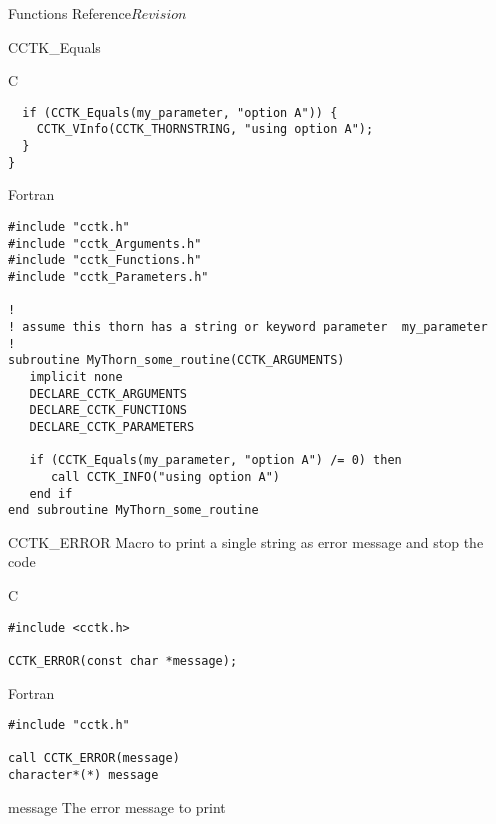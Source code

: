 \begin{cactuspart}{ Functions Reference}{}{$Revision$}
\begin{FunctionDescription}{CCTK\_Equals}
\begin{ExampleSection}
\begin{Example}{C}
\begin{verbatim}
  if (CCTK_Equals(my_parameter, "option A")) {
    CCTK_VInfo(CCTK_THORNSTRING, "using option A");
  }
}
\end{verbatim}
\end{Example}

\begin{Example}{Fortran}
\begin{verbatim}
#include "cctk.h"
#include "cctk_Arguments.h"
#include "cctk_Functions.h"
#include "cctk_Parameters.h"

!
! assume this thorn has a string or keyword parameter  my_parameter
!
subroutine MyThorn_some_routine(CCTK_ARGUMENTS)
   implicit none
   DECLARE_CCTK_ARGUMENTS
   DECLARE_CCTK_FUNCTIONS
   DECLARE_CCTK_PARAMETERS
   
   if (CCTK_Equals(my_parameter, "option A") /= 0) then
      call CCTK_INFO("using option A")
   end if
end subroutine MyThorn_some_routine
\end{verbatim}
\end{Example}
\end{ExampleSection}
\end{FunctionDescription}

\begin{FunctionDescription}{CCTK\_ERROR}
\label{CCTK-ERROR}
Macro to print a single string as error message and stop the code

\begin{SynopsisSection}
\begin{Synopsis}{C}
\begin{verbatim}
#include <cctk.h>

CCTK_ERROR(const char *message);
\end{verbatim}
\end{Synopsis}
\begin{Synopsis}{Fortran}
\begin{verbatim}
#include "cctk.h"

call CCTK_ERROR(message)
character*(*) message
\end{verbatim}
\end{Synopsis}
\end{SynopsisSection}

\begin{ParameterSection}
\begin{Parameter}{message}
The error message to print
\end{Parameter}
\end{ParameterSection}


\end{FunctionDescription}
\end{cactuspart}
